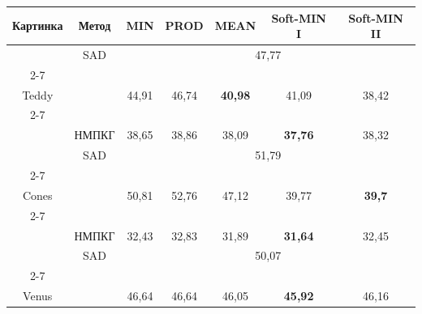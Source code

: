   \begin{table}\small %


  \begin{center}




  \vspace*{2ex}


  


  \begin{tabular}{|c|c|c|c|c|c|c|}


  \hline


Картинка&Метод&MIN&PROD&MEAN&Soft-MIN I&Soft-MIN II\\


\hline


&SAD&\multicolumn{5}{c|}{47,77}\\


\cline{2-7}


&&&&&&\\[-9pt]


Teddy&\cite{8-bob}&44,91&46,74&\textbf{40,98}&41,09&38,42\\


\cline{2-7}


&&&&&&\\[-9pt]


&НМПКГ&38,65&38,86&38,09&\textbf{37,76}&38,32\\


\hline


&SAD&\multicolumn{5}{c|}{51,79}\\


\cline{2-7}


&&&&&&\\[-9pt]


Cones&\cite{8-bob}&50,81&52,76&47,12&39,77&\textbf{39,7}\\


\cline{2-7}


&&&&&&\\[-9pt]


&НМПКГ&32,43&32,83&31,89&\textbf{31,64}&32,45\\


\hline


&SAD&\multicolumn{5}{c|}{50,07}\\


\cline{2-7}


&&&&&&\\[-9pt]


Venus&\cite{8-bob}&46,64&46,64&46,05&\textbf{45,92}&46,16\\



\end{tabular}
\end{center}
\end{table}
